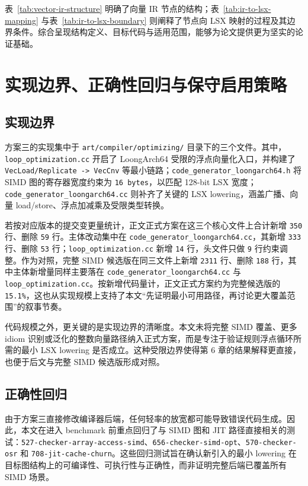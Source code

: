 表~\ref{tab:vector-ir-structure} 明确了向量 IR 节点的结构；表~\ref{tab:ir-to-lsx-mapping} 与表~\ref{tab:ir-to-lsx-boundary} 则阐释了节点向 LSX 映射的过程及其边界条件。综合呈现结构定义、目标代码与适用范围，能够为论文提供更为坚实的论证基础。

\section{实现边界、正确性回归与保守启用策略}

\subsection{实现边界}

方案三的实现集中于 \texttt{art/compiler/optimizing/} 目录下的三个文件。其中，\texttt{loop\_optimization.cc} 开启了 LoongArch64 受限的浮点向量化入口，并构建了 \texttt{VecLoad/Replicate -> VecCnv} 等最小链路；\texttt{code\_generator\_loongarch64.h} 将 SIMD 图的寄存器宽度约束为 \texttt{16 bytes}，以匹配 128-bit LSX 宽度；\texttt{code\_generator\_loongarch64.cc} 则补齐了关键的 LSX lowering，涵盖广播、向量 load/store、浮点加减乘及受限类型转换。

若按对应版本的提交变更量统计，正文正式方案在这三个核心文件上合计新增 \texttt{350} 行、删除 \texttt{59} 行。主体改动集中在 \texttt{code\_generator\_loongarch64.cc}，其新增 \texttt{333} 行、删除 \texttt{53} 行；\texttt{loop\_optimization.cc} 新增 \texttt{14} 行，头文件只做 \texttt{9} 行约束调整。作为对照，完整 SIMD 候选版在同三文件上新增 \texttt{2311} 行、删除 \texttt{188} 行，其中主体新增量同样主要落在 \texttt{code\_generator\_loongarch64.cc} 与 \texttt{loop\_optimization.cc}。按新增代码量计，正文正式方案约为完整候选版的 \texttt{15.1\%}，这也从实现规模上支持了本文“先证明最小可用路径，再讨论更大覆盖范围”的叙事节奏。

代码规模之外，更关键的是实现边界的清晰度。本文未将完整 SIMD 覆盖、更多 idiom 识别或泛化的整数向量路径纳入正式方案，而是专注于验证规则浮点循环所需的最小 LSX lowering 是否成立。这种受限边界使得第 6 章的结果解释更直接，也便于后文与完整 SIMD 候选版形成对照。

\subsection{正确性回归}

由于方案三直接修改编译器后端，任何轻率的放宽都可能导致错误代码生成。因此，本文在进入 benchmark 前重点回归了与 SIMD 图和 JIT 路径直接相关的测试：\texttt{527-checker-array-access-simd}、\texttt{656-checker-simd-opt}、\texttt{570-checker-osr} 和 \texttt{708-jit-cache-churn}。这些回归测试旨在确认新引入的最小 lowering 在目标图结构上的可编译性、可执行性与正确性，而非证明完整后端已覆盖所有 SIMD 场景。

